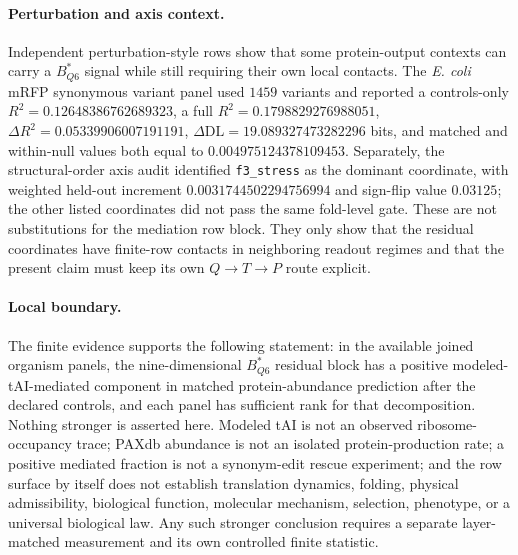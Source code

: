 \paragraph{Perturbation and axis context.}
Independent perturbation-style rows show that some protein-output contexts can carry a $B^{\ast}_{Q6}$ signal while still requiring their own local contacts.  The \textit{E. coli} mRFP synonymous variant panel used $1459$ variants and reported a controls-only $R^2=0.12648386762689323$, a full $R^2=0.1798829276988051$, $\Delta R^2=0.05339906007191191$, $\Delta\mathrm{DL}=19.089327473282296$ bits, and matched and within-null values both equal to $0.004975124378109453$.  Separately, the structural-order axis audit identified \texttt{f3\_stress} as the dominant coordinate, with weighted held-out increment $0.0031744502294756994$ and sign-flip value $0.03125$; the other listed coordinates did not pass the same fold-level gate.  These are not substitutions for the mediation row block.  They only show that the residual coordinates have finite-row contacts in neighboring readout regimes and that the present claim must keep its own $Q \to T \to P$ route explicit.

\paragraph{Local boundary.}
The finite evidence supports the following statement: in the available joined organism panels, the nine-dimensional $B^{\ast}_{Q6}$ residual block has a positive modeled-tAI-mediated component in matched protein-abundance prediction after the declared controls, and each panel has sufficient rank for that decomposition.  Nothing stronger is asserted here.  Modeled tAI is not an observed ribosome-occupancy trace; PAXdb abundance is not an isolated protein-production rate; a positive mediated fraction is not a synonym-edit rescue experiment; and the row surface by itself does not establish translation dynamics, folding, physical admissibility, biological function, molecular mechanism, selection, phenotype, or a universal biological law.  Any such stronger conclusion requires a separate layer-matched measurement and its own controlled finite statistic.
